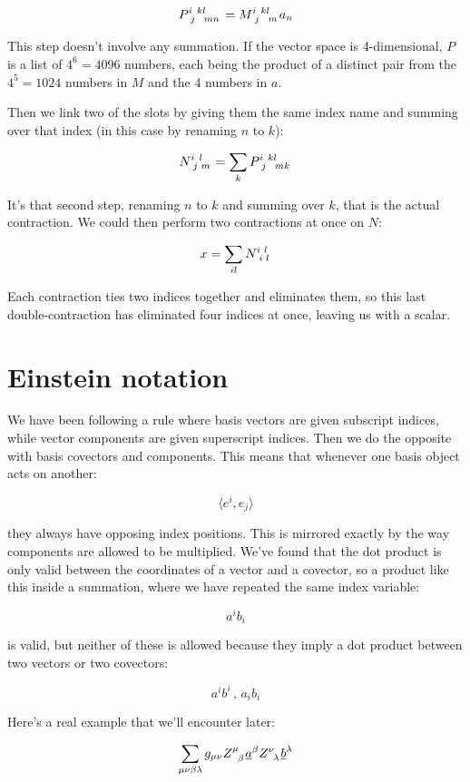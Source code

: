 $$
P\indices{^i_j^k^l_m_n} = M\indices{^i_j^k^l_m} a_n
$$

This step doesn't involve any summation. If the vector space is 4-dimensional, $P$ is a list of $4^6 = 4096$ numbers, each being the product of a distinct pair from the $4^5 = 1024$ numbers in $M$ and the $4$ numbers in $a$.

Then we link two of the slots by giving them the same index name and summing over that index (in this case by renaming $n$ to $k$):

$$
N\indices{^i_j^l_m} = \sum_{k} P\indices{^i_j^k^l_m_k}
$$

It's that second step, renaming $n$ to $k$ and summing over $k$, that is the actual contraction. We could then perform two contractions at once on $N$:

$$
x = \sum_{il} N\indices{^i_i^l_l}
$$

Each contraction ties two indices together and eliminates them, so this last double-contraction has eliminated four indices at once, leaving us with a scalar.

\section{Einstein notation}

We have been following a rule where basis vectors are given subscript indices, while vector components are given superscript indices. Then we do the opposite with basis covectors and components. This means that whenever one basis object acts on another:

$$
\langle e^i, e_j \rangle
$$

they always have opposing index positions. This is mirrored exactly by the way components are allowed to be multiplied. We've found that the dot product is only valid between the coordinates of a vector and a covector, so a product like this inside a summation, where we have repeated the same index variable:

$$
a^i b_i
$$

is valid, but neither of these is allowed because they imply a dot product between two vectors or two covectors:

$$
a^i b^i \, , \, a_i b_i
$$

Here's a real example that we'll encounter later:

$$
\sum_{\mu\nu\beta\lambda} g_{\mu\nu} Z\indices{^\mu_\beta} \underline{a}^{\beta} Z\indices{^\nu_\lambda} \underline{b}^{\lambda}
$$

